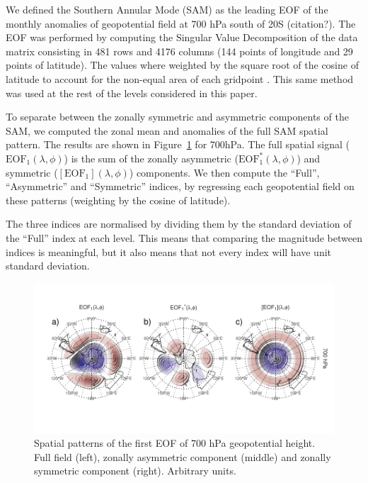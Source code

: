 \documentclass[]{ametsocV5}
\begin{document}
We defined the Southern Annular Mode (SAM) as the leading EOF of the
monthly anomalies of geopotential field at 700 hPa south of 20\degree S
(citation?). The EOF was performed by computing the Singular Value
Decomposition of the data matrix consisting in 481 rows and 4176 columns
(144 points of longitude and 29 points of latitude). The values where
weighted by the square root of the cosine of latitude to account for the
non-equal area of each gridpoint \citep{chung1999}. This same method was
used at the rest of the levels considered in this paper.

To separate between the zonally symmetric and asymmetric components of
the SAM, we computed the zonal mean and anomalies of the full SAM
spatial pattern. The results are shown in Figure~\ref{fig:method} for
700hPa. The full spatial signal (\(\mathrm{EOF_1}(\lambda, \phi)\)) is
the sum of the zonally asymmetric (\(\mathrm{EOF_1^*}(\lambda, \phi)\))
and symmetric (\([\mathrm{EOF_1}](\lambda, \phi)\)) components. We then
compute the ``Full'', ``Asymmetric'' and ``Symmetric'' indices, by
regressing each geopotential field on these patterns (weighting by the
cosine of latitude).

The three indices are normalised by dividing them by the standard
deviation of the ``Full'' index at each level. This means that comparing
the magnitude between indices is meaningful, but it also means that not
every index will have unit standard deviation.

\begin{figure}
\includegraphics{method-1} \caption[Spatial patterns of the first EOF of 700 hPa geopotential height]{Spatial patterns of the first EOF of 700 hPa geopotential height. Full field (left), zonally asymmetric component (middle) and zonally symmetric component (right). Arbitrary units.}\label{fig:method}
\end{figure}
\end{document}
